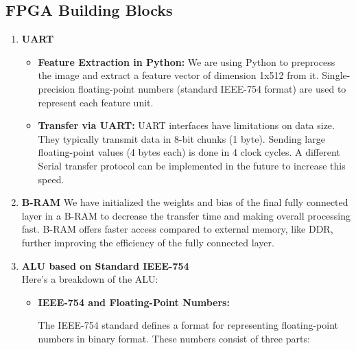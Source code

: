 \documentclass{article}
\begin{document}
        \subsection{FPGA Building Blocks} 
\begin{enumerate}
        
           \item  \textbf{UART}
   
\begin{itemize}
    \item \textbf{Feature Extraction in Python:} We are using Python to preprocess the image and extract a feature vector of dimension 1x512 from it. Single-precision floating-point numbers (standard IEEE-754 format) are used to represent each feature unit.
    \item \textbf{Transfer via UART:}  UART interfaces have limitations on data size. They typically transmit data in 8-bit chunks (1 byte). Sending large floating-point values (4 bytes each) is done in 4 clock cycles. A different Serial transfer protocol can be implemented in the future to increase this speed.

\end{itemize}

\item \textbf{B-RAM}
We have initialized the weights and bias of the final fully connected layer in a B-RAM to decrease the transfer time and making overall processing fast. B-RAM offers faster access compared to external memory, like DDR, further improving the efficiency of the fully connected layer.
                
      
\item \textbf{ALU based on Standard IEEE-754 } 
                \\
                Here's a breakdown of the ALU:

\begin{itemize}
\item \textbf{IEEE-754 and Floating-Point Numbers:}

The IEEE-754 standard defines a format for representing floating-point numbers in binary format. These numbers consist of three parts:


\end{itemize}
\end{enumerate}
\end{document}

